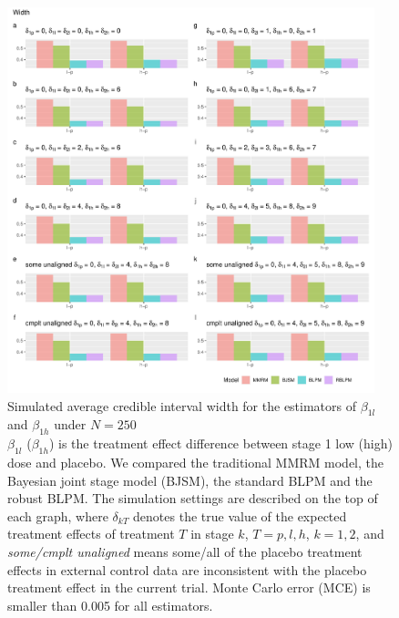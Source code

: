\begin{figure}
\includegraphics[width=0.95\textwidth]{chapters/figures/Width_250.pdf}
\caption{Simulated average credible interval width for the estimators of $\beta_{1l}$ and $\beta_{1h}$ under $N = 250$ \label{fig:Width_250}\\$\beta_{1l}$ ($\beta_{1h}$) is the treatment effect difference between stage 1 low (high) dose and placebo. We compared the traditional MMRM model, the Bayesian joint stage model (BJSM), the standard BLPM and the robust BLPM. The simulation settings are described on the top of each graph, where $\delta_{kT}$ denotes the true value of the expected treatment effects of treatment $T$ in stage $k$, $T = p, l, h$, $k = 1, 2$, and \emph{some/cmplt unaligned} means some/all of the placebo treatment effects in external control data are inconsistent with the placebo treatment effect in the current trial. Monte Carlo error (MCE) is smaller than 0.005 for all estimators.}
\end{figure}



